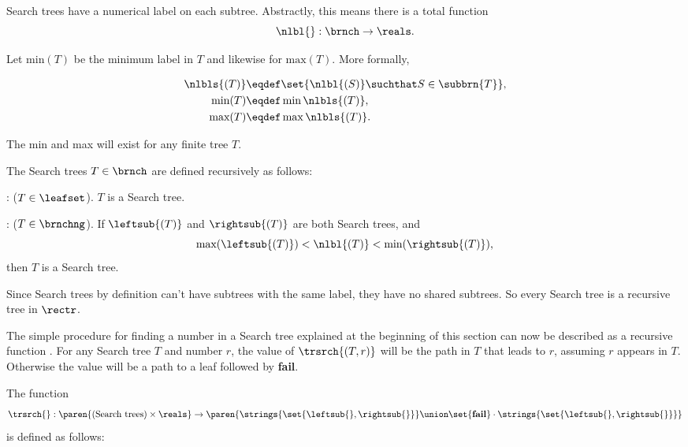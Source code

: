\begin{definition}
Search trees have a numerical label on each subtree.  Abstractly, this
means there is a total function
\[
\nlbl{}:\brnch \to \reals.
\]

Let $\text{min}(T)$ be the minimum label in $T$ and likewise for
$\text{max}(T)$.  More formally,
\begin{definition}
\begin{align}
\nlbls{(T)} & \eqdef \set{\nlbl{(S)} \suchthat S \in \subbrn{T}},\\
\text{min}(T) &\eqdef \min \nlbls{(T)}, \label{defminT}\\
\text{max}(T) &\eqdef \max \nlbls{(T)}.\label{defmaxT}
\end{align}
\end{definition}
The min and max will exist for any finite tree $T$.

\begin{definition}\label{defsearchtree}
The Search trees $T \in \brnch$ are defined recursively as follows:

: ($T \in \leafset$).  $T$ is a Search tree.

: ($T \in \brnchng$).
If $\leftsub{(T)}$ and $\rightsub{(T)}$ are both Search trees, and
\[
\text{max}(\leftsub{(T)}) < \nlbl{(T)} < \text{min}(\rightsub{(T)}),
\]
then $T$ is a Search tree.
\end{definition}

Since Search trees by definition can't have subtrees with the same
label, they have no shared subtrees.  So every Search tree is a
recursive tree in $\rectr$.

\iffalse
\begin{definition}\label{defsearchtree}
A recursive tree $T \in \rectr$ is a \term{Search tree} when
\begin{equation}\label{}
\text{max}(\leftsub{(S)}) < \nlbl{(S)} < \text{min}(\rightsub{(S)}).
\end{equation}
for every nonleaf $S \in \subbrn{T}$.
\end{definition}
\fi

The simple procedure for finding a number in a Search tree explained
at the beginning of this section can now be described as a recursive
function \trsrch{}.  For any Search tree $T$ and number $r$, the value
of $\trsrch{(T,r)}$ will be the path in $T$ that leads to $r$,
assuming $r$ appears in $T$.  Otherwise the value will be a path to a
leaf followed by \textbf{fail}.

\begin{definition}
The function
\[
\trsrch{}: \paren{\text{(Search trees)} \times \reals} \to
\paren{\strings{\set{\leftsub{},\rightsub{}}} \union \set{\textbf{fail}}\cdot\strings{\set{\leftsub{},\rightsub{}}}}
\]
is defined as follows:


\end{definition}
\end{definition}
